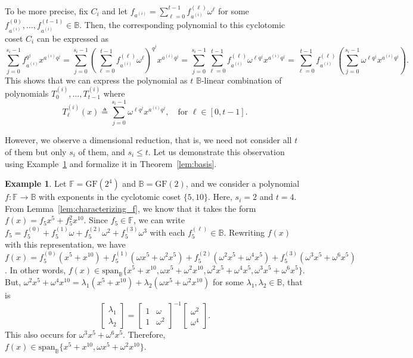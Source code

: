\documentclass[onecolumn]{IEEEtran}
\theoremstyle{plain}
\theoremstyle{definition}
\newtheorem{example}[definition]{Example}
\newcommand{\FF}{\mathbb{F}}
\newcommand{\BB}{\mathbb{B}}
\newcommand{\GF}{{\mathrm{GF}}}
\begin{document}
To be more precise, fix $C_i$ and let $f_{a^{(i)}} = \sum_{\ell=0}^{t-1} f_{a^{(i)}}^{(\ell)} \omega^\ell$ for some $f_{a^{(i)}}^{(0)},\ldots,f_{a^{(i)}}^{(t-1)}\in\BB$. Then, the corresponding polynomial to this cyclotomic coset $C_i$ can be expressed as
$$
\sum_{j=0}^{s_i - 1} f_{a^{(i)}}^{q^j} x^{a^{(i)}q^j}  
= \sum_{j=0}^{s_i-1} \left(\sum_{\ell = 0}^{t-1} f_{a^{(i)}}^{(\ell)}\omega^\ell\right)^{q^j} x^{a^{(i)}q^j}
= \sum_{j=0}^{s_i-1} \sum_{\ell = 0}^{t-1} f_{a^{(i)}}^{(\ell)}\omega^{\ell{q^j}} x^{a^{(i)}q^j}
= \sum_{\ell=0}^{t-1}f_{a^{(i)}}^{(\ell)}\left(\sum_{j=0}^{s_i-1} \omega^{\ell q^j}x^{a^{(i)}q^j}\right).
$$
This shows that we can express the polynomial as $t$ $\BB$-linear combination of polynomials $T_0^{(i)},\ldots,T_{t-1}^{(i)}$ where
$$
T_\ell^{(i)}(x) \triangleq \sum_{j=0}^{s_i-1} \omega^{\ell q^j}x^{a^{(i)}q^j},\quad\text{for }\ell\in[0,t-1].
$$

However, we observe a dimensional reduction, that is, we need not consider all $t$ of them but only $s_i$ of them, and $s_i \le t$. Let us demonstrate this observation using Example~\ref{ex:dim_reduction} and formalize it in Theorem~\ref{lem:basis}.

\begin{example}\label{ex:dim_reduction}
    Let $\FF = \GF(2^4)$ and $\BB = \GF(2)$, and we consider a polynomial $f:\FF\to\BB$ with exponents in the cyclotomic coset $\{5,10\}$. Here, $s_i = 2$ and $t= 4$. From Lemma~\ref{lem:characterizing_f}, we know that it takes the form $f(x) = f_5 x^5 + f_5^2 x^{10}$. Since $f_5\in\FF$, we can write $f_5 = f_5^{(0)} + f_5^{(1)} \omega + f_5^{(2)} \omega^2 + f_5^{(3)} \omega^3$ with each $f_5^{(\ell)}\in\BB$. Rewriting $f(x)$ with this representation, we have
$f(x) = f_5^{(0)}(x^5 + x^{10}) + f_5^{(1)}(\omega x^5 + \omega^2 x^5) + f_5^{(2)}(\omega^2 x^5 + \omega^4 x^5) + f_5^{(3)}(\omega^3 x^5 + \omega^6 x^5)$. In other words, $f(x)\in \text{span}_\BB \{x^5+x^{10}, \omega x^5 + \omega^2 x^{10}, \omega^2 x^5 + \omega^4 x^5, \omega^3 x^5 + \omega^6 x^5\}$. But, $\omega^2 x^5 + \omega^4 x^{10} = \lambda_1 (x^5+x^{10}) + \lambda_2 (\omega x^5 + \omega^2 x^{10})$ for some $\lambda_1,\lambda_2\in\BB$, that is
$$
\begin{bmatrix}
    \lambda_1\\
    \lambda_2
\end{bmatrix} = \begin{bmatrix}
    1 & \omega\\
    1 & \omega^2
\end{bmatrix}^{-1} \begin{bmatrix}
    \omega^2\\
    \omega^4
\end{bmatrix}.
$$
This also occurs for $\omega^3 x^5 +\omega^6 x^5$. Therefore, $f(x)\in\text{span}_{\BB}\{x^5 + x^{10}, \omega x^5 + \omega^2 x^{10}\}$.
\end{example}
\end{document}
